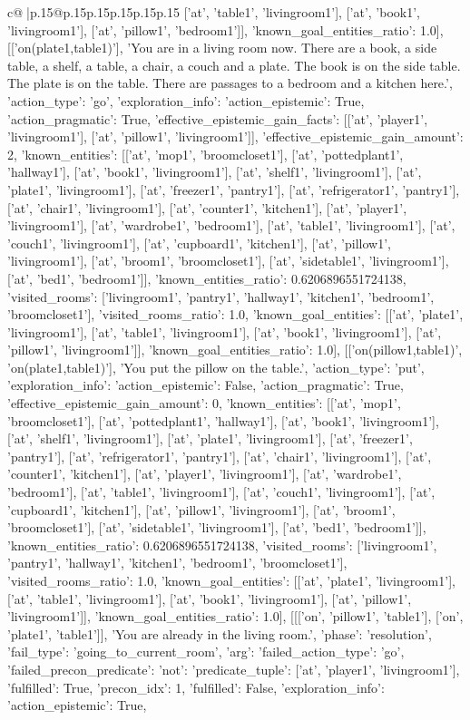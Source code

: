 \documentclass{article}
\begin{document}
{\begin{supertabular}{c@{$\;$}|p{.15\linewidth}@{}p{.15\linewidth}p{.15\linewidth}p{.15\linewidth}p{.15\linewidth}p{.15\linewidth}}
{{{['at', 'table1', 'livingroom1'], ['at', 'book1', 'livingroom1'], ['at', 'pillow1', 'bedroom1']], 'known_goal_entities_ratio': 1.0}}], [['on(plate1,table1)'], 'You are in a living room now. There are a book, a side table, a shelf, a table, a chair, a couch and a plate. The book is on the side table. The plate is on the table. There are passages to a bedroom and a kitchen here.', {'action_type': 'go', 'exploration_info': {'action_epistemic': True, 'action_pragmatic': True, 'effective_epistemic_gain_facts': [['at', 'player1', 'livingroom1'], ['at', 'pillow1', 'livingroom1']], 'effective_epistemic_gain_amount': 2, 'known_entities': [['at', 'mop1', 'broomcloset1'], ['at', 'pottedplant1', 'hallway1'], ['at', 'book1', 'livingroom1'], ['at', 'shelf1', 'livingroom1'], ['at', 'plate1', 'livingroom1'], ['at', 'freezer1', 'pantry1'], ['at', 'refrigerator1', 'pantry1'], ['at', 'chair1', 'livingroom1'], ['at', 'counter1', 'kitchen1'], ['at', 'player1', 'livingroom1'], ['at', 'wardrobe1', 'bedroom1'], ['at', 'table1', 'livingroom1'], ['at', 'couch1', 'livingroom1'], ['at', 'cupboard1', 'kitchen1'], ['at', 'pillow1', 'livingroom1'], ['at', 'broom1', 'broomcloset1'], ['at', 'sidetable1', 'livingroom1'], ['at', 'bed1', 'bedroom1']], 'known_entities_ratio': 0.6206896551724138, 'visited_rooms': ['livingroom1', 'pantry1', 'hallway1', 'kitchen1', 'bedroom1', 'broomcloset1'], 'visited_rooms_ratio': 1.0, 'known_goal_entities': [['at', 'plate1', 'livingroom1'], ['at', 'table1', 'livingroom1'], ['at', 'book1', 'livingroom1'], ['at', 'pillow1', 'livingroom1']], 'known_goal_entities_ratio': 1.0}}], [['on(pillow1,table1)', 'on(plate1,table1)'], 'You put the pillow on the table.', {'action_type': 'put', 'exploration_info': {'action_epistemic': False, 'action_pragmatic': True, 'effective_epistemic_gain_amount': 0, 'known_entities': [['at', 'mop1', 'broomcloset1'], ['at', 'pottedplant1', 'hallway1'], ['at', 'book1', 'livingroom1'], ['at', 'shelf1', 'livingroom1'], ['at', 'plate1', 'livingroom1'], ['at', 'freezer1', 'pantry1'], ['at', 'refrigerator1', 'pantry1'], ['at', 'chair1', 'livingroom1'], ['at', 'counter1', 'kitchen1'], ['at', 'player1', 'livingroom1'], ['at', 'wardrobe1', 'bedroom1'], ['at', 'table1', 'livingroom1'], ['at', 'couch1', 'livingroom1'], ['at', 'cupboard1', 'kitchen1'], ['at', 'pillow1', 'livingroom1'], ['at', 'broom1', 'broomcloset1'], ['at', 'sidetable1', 'livingroom1'], ['at', 'bed1', 'bedroom1']], 'known_entities_ratio': 0.6206896551724138, 'visited_rooms': ['livingroom1', 'pantry1', 'hallway1', 'kitchen1', 'bedroom1', 'broomcloset1'], 'visited_rooms_ratio': 1.0, 'known_goal_entities': [['at', 'plate1', 'livingroom1'], ['at', 'table1', 'livingroom1'], ['at', 'book1', 'livingroom1'], ['at', 'pillow1', 'livingroom1']], 'known_goal_entities_ratio': 1.0}}], [[['on', 'pillow1', 'table1'], ['on', 'plate1', 'table1']], 'You are already in the living room.', {'phase': 'resolution', 'fail_type': 'going_to_current_room', 'arg': {'failed_action_type': 'go', 'failed_precon_predicate': {'not': {'predicate_tuple': ['at', 'player1', 'livingroom1'], 'fulfilled': True, 'precon_idx': 1}, 'fulfilled': False}}, 'exploration_info': {'action_epistemic': True, }}}
\end{supertabular}}
\end{document}
